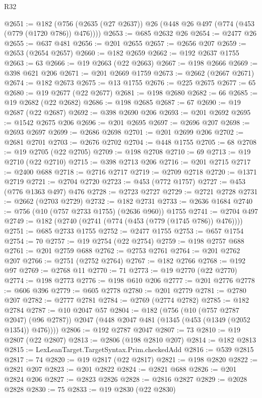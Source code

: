 \begin{lexlean}{R32}
\begin{coremodule}
@2651 := @182 (@756 (@2635 (@27 @2637)) @26 (@448 @26 @497 (@774 (@453 (@779 (@1720 @786)) @476))))
@2653 := @685 @2632 @26
@2654 := @2477 @26
@2655 := @637 @481
@2656 := @201 @2655
@2657 := @2656 @207
@2659 := @2653 (@2654 @2657)
@2660 := @182 @2659
@2662 := @192 @2637 @1755
@2663 := 63
@2666 := @19 @2663 (@22 @2663)
@2667 := @198 @2666
@2669 := @398 @621 @206
@2671 := @201 @2669 @1759
@2673 := @2662 (@2667 @2671)
@2674 := @182 @2673
@2675 := @13 @1755
@2676 := @225 @2675
@2677 := 65
@2680 := @19 @2677 (@22 @2677)
@2681 := @198 @2680
@2682 := 66
@2685 := @19 @2682 (@22 @2682)
@2686 := @198 @2685
@2687 := 67
@2690 := @19 @2687 (@22 @2687)
@2692 := @398 @2690 @206
@2693 := @201 @2692
@2695 := @1542 @2675 @206
@2696 := @201 @2695
@2697 := @2696 @207
@2698 := @2693 @2697
@2699 := @2686 @2698
@2701 := @201 @2699 @206
@2702 := @2681 @2701
@2703 := @2676 @2702
@2704 := @448 @1755
@2705 := 68
@2708 := @19 @2705 (@22 @2705)
@2709 := @198 @2708
@2710 := 69
@2713 := @19 @2710 (@22 @2710)
@2715 := @398 @2713 @206
@2716 := @201 @2715
@2717 := @2400 @688
@2718 := @2716 @2717
@2719 := @2709 @2718
@2720 := @1371 @2719
@2721 := @2704 @2720
@2723 := @453 (@772 @1757)
@2727 := @453 (@776 @1363 @497) @476
@2728 := @2723 @2727
@2729 := @2721 @2728
@2731 := @2662 (@2703 @2729)
@2732 := @182 @2731
@2733 := @2636 @1684
@2740 := @756 (@10 (@757 @2733 @1755) (@2636 @960)) @1755
@2741 := @2704 @497
@2749 := @182 (@2740 (@2741 (@774 (@453 (@779 (@1745 @786)) @476))))
@2751 := @685 @2733 @1755
@2752 := @2477 @1755
@2753 := @657 @1754
@2754 := 70
@2757 := @19 @2754 (@22 @2754)
@2759 := @198 @2757 @688
@2761 := @201 @2759 @688
@2762 := @2753 @2761
@2764 := @201 @2762 @207
@2766 := @2751 (@2752 @2764)
@2767 := @182 @2766
@2768 := @192 @97
@2769 := @2768 @11
@2770 := 71
@2773 := @19 @2770 (@22 @2770)
@2774 := @198 @2773
@2776 := @198 @610 @206
@2777 := @201 @2776
@2778 := @606 @396
@2779 := @605 @2778
@2780 := @201 @2779
@2781 := @2780 @207
@2782 := @2777 @2781
@2784 := @2769 (@2774 @2782)
@2785 := @182 @2784
@2787 := @10 @2047 @57
@2804 := @182
    (@756
      (@10 (@757 @2787 @2047) (@96 @2787))
      @2047
      (@448 @2047 @481 (@1345 (@453 (@1349 (@2052 @1354)) @476))))
@2806 := @192 @2787 @2047
@2807 := 73
@2810 := @19 @2807 (@22 @2807)
@2813 := @2806 (@198 @2810 @207)
@2814 := @182 @2813
@2815 := LexLeanTarget.TargetSyntax.Prim.checkedAdd
@2816 := @539 @2815
@2817 := 74
@2820 := @19 @2817 (@22 @2817)
@2821 := @198 @2820
@2822 := @2821 @207
@2823 := @201 @2822
@2824 := @2821 @688
@2826 := @201 @2824 @206
@2827 := @2823 @2826
@2828 := @2816 @2827
@2829 := @2028 @2828
@2830 := 75
@2833 := @19 @2830 (@22 @2830)

\end{coremodule}
\end{lexlean}
